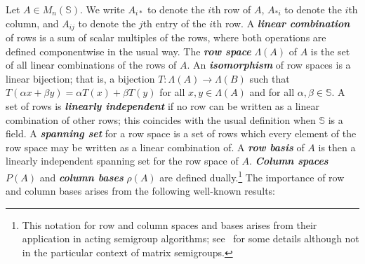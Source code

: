 \documentclass[11pt]{article}
\newcommand{\defn}[1]{\textbf{\textit{#1}}}
\numberwithin{equation}{section}
\renewcommand{\to}{\longrightarrow}
\newcommand{\RowS}{\Lambda}
\newcommand{\ColS}{P}
\newcommand{\ColB}{\rho}
\begin{document}
Let $A \in M_n(\mathbb{S})$. We write $A_{i*}$ to denote the $i$th row of $A$,
$A_{*i}$ to denote the $i$th column, and $A_{ij}$ to denote the $j$th entry of
the $i$th row. A \defn{linear combination} of rows is a sum of scalar multiples
of the rows, where both operations are defined componentwise in the usual way.
The \defn{row space} $\RowS(A)$ of $A$ is the set of all linear combinations of
the rows of $A$. An \defn{isomorphism} of row spaces is a linear bijection; that
is, a bijection $T: \RowS(A) \to \RowS(B)$ such that $T(\alpha x + \beta y) =
\alpha T(x) + \beta T(y)$ for all $x, y \in \RowS(A)$ and for all $\alpha, \beta
\in \mathbb{S}$.  A set of rows is \defn{linearly independent} if no row can be
written as a linear combination of other rows; this coincides with the usual
definition when $\mathbb{S}$ is a field. A \defn{spanning set} for a row space
is a set of rows which every element of the row space may be written as a linear
combination of.  A \defn{row basis} of $A$ is then a linearly independent
spanning set for the row space of $A$. \defn{Column spaces} $\ColS(A)$ and
\defn{column bases} $\ColB(A)$ are defined dually.\footnote{This notation for
  row and column spaces and bases arises from their application in acting
  semigroup algorithms; see~\cite{East2019aa} for some details although not in
  the particular context of matrix semigroups.}
The importance of row and column bases arises from the following well-known
results:
\end{document}
